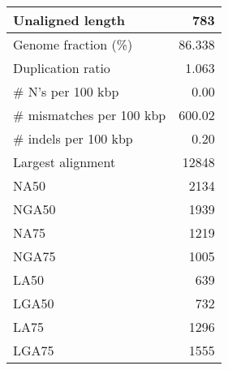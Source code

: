 \documentclass[12pt,a4paper]{article}
\begin{document}
\begin{table}[ht]
\begin{center}
\begin{tabular}{|l*{1}{|r}|}
Unaligned length & 783 \\ \hline
Genome fraction (\%) & 86.338 \\ \hline
Duplication ratio & 1.063 \\ \hline
\# N's per 100 kbp & 0.00 \\ \hline
\# mismatches per 100 kbp & 600.02 \\ \hline
\# indels per 100 kbp & 0.20 \\ \hline
Largest alignment & 12848 \\ \hline
NA50 & 2134 \\ \hline
NGA50 & 1939 \\ \hline
NA75 & 1219 \\ \hline
NGA75 & 1005 \\ \hline
LA50 & 639 \\ \hline
LGA50 & 732 \\ \hline
LA75 & 1296 \\ \hline
LGA75 & 1555 \\ \hline
\end{tabular}
\end{center}
\end{table}
\end{document}
